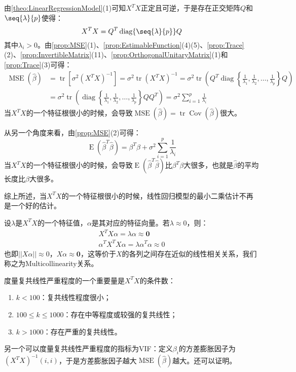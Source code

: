 \begin{note}
	由\cref{theo:LinearRegressionModel}(1)可知$X^TX$正定且可逆，于是存在正交矩阵$Q$和$\seq{\lambda}{p}$使得：
	\begin{equation*}
		X^TX=Q^T\operatorname{diag}\{\seq{\lambda}{p}\}Q
	\end{equation*}
	其中$\lambda_i>0$。由\cref{prop:MSE}(1)、\cref{prop:EstimableFunction}(4)(5)、\cref{prop:Trace}(2)、\cref{prop:InvertibleMatrix}(11)、\cref{prop:OrthogonalUnitaryMatrix}(1)和\cref{prop:Trace}(3)可得：
	\begin{align*}
		\operatorname{MSE}(\hat{\beta})&=\operatorname{tr}[\sigma^2(X^TX)^{-1}]=\sigma^2\operatorname{tr}(X^TX)^{-1}=\sigma^2\operatorname{tr}
		\left(Q^T\operatorname{diag}\left\{\frac{1}{\lambda_1},\frac{1}{\lambda_2},\dots,\frac{1}{\lambda_{p}}\right\}Q\right) \\
		&=\sigma^2\operatorname{tr}
		\left(\operatorname{diag}\left\{\frac{1}{\lambda_1},\frac{1}{\lambda_2},\dots,\frac{1}{\lambda_{p}}\right\}QQ^T\right)=\sigma^2\sum_{i=1}^{p}\frac{1}{\lambda_i}
	\end{align*}
	当$X^TX$的一个特征根很小的时候，会导致$\operatorname{MSE}(\hat{\beta})=\operatorname{tr}\operatorname{Cov}(\hat{\beta})$很大。\par
	从另一个角度来看，由\cref{prop:MSE}(2)可得：
	\begin{equation*}
		\operatorname{E}(\hat{\beta}^T\hat{\beta})=\beta^T\beta+\sigma^2\sum_{i=1}^{p}\frac{1}{\lambda_i}
	\end{equation*}
	当$X^TX$的一个特征根很小的时候，会导致$\operatorname{E}(\hat{\beta}^T\hat{\beta})$比$\beta^T\beta$大很多，也就是$\hat{\beta}$的平均长度比$\beta$大很多。\par
	综上所述，当$X^TX$的一个特征根很小的时候，线性回归模型的最小二乘估计不再是一个好的估计。\par
	设$\lambda$是$X^TX$的一个特征值，$\alpha$是其对应的特征向量。若$\lambda\approx0$，则：
	\begin{gather*}
		X^TX\alpha=\lambda\alpha\approx\mathbf{0} \\
		\alpha^TX^TX\alpha=\lambda\alpha^T\alpha\approx0
	\end{gather*}
	也即$||X\alpha||\approx0$，$X\alpha\approx\mathbf{0}$，这等价于$X$的各列之间存在近似的线性相关关系，我们称之为\gls{Multicollinearity}关系。\par
	度量复共线性严重程度的一个重要量是$X^TX$的条件数：
	\begin{enumerate}
		\item $k<100$：复共线性程度很小；
		\item $100\leqslant k\leqslant1000$：存在中等程度或较强的复共线性；
		\item $k>1000$：存在严重的复共线性。
	\end{enumerate}
	另一个可以度量复共线性严重程度的指标为\gls{VIF}：定义$\beta_i$的方差膨胀因子为$(X^TX)^{-1}(i,i)$，于是方差膨胀因子越大$\operatorname{MSE}(\hat{\beta})$越大。还可以证明。
\end{note}
